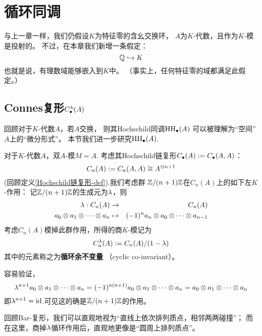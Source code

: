 \chapter{循环同调}

与上一章一样，我们仍假设$K$为特征零的含幺交换环，
$A$为$K$-代数，且作为$K$-模是投射的。
不过，在本章我们新增一条假定：
$$\mathbb{Q}\hookrightarrow K$$
也就是说，有理数域能够嵌入到$K$中。
（事实上，任何特征零的域都满足此假定。）

\section{Connes复形$C^{\lambda}_{\bullet}(A)$}

回顾对于$K$-代数$A$，若$A$交换，
则其Hochschild同调$\operatorname{HH}_{\bullet}(A)$
可以被理解为“空间”$A$上的“微分形式”。
本节我们进一步研究$\operatorname{HH}_{\bullet}(A)$.

\begin{notation}
对于$K$-代数$A$，双$A$-模$M=A$.
考虑其Hochschild链复形$C_{\bullet}(A):=C_{\bullet}(A,A)$：
$$C_n(A):=C_n(A,A)\cong A^{\otimes n+1}$$
(回顾定义\ref{Hochschild链复形-def}).我们考虑群
$\mathbb{Z}/(n+1)\mathbb{Z}$在$C_n(A)$上的如下左$K$-作用：
记$\mathbb{Z}/(n+1)\mathbb{Z}$的生成元为$\lambda$，则
\begin{eqnarray*}
\lambda:C_n(A)&\to&C_n(A)\\
a_0\otimes a_1\otimes\cdots\otimes a_n
&\mapsto&
(-1)^na_n\otimes a_0\otimes\cdots\otimes a_{n-1}
\end{eqnarray*}
考虑$C_n(A)$模掉此群作用，所得的商$K$-模记为
$$C^{\lambda}_n(A):=C_n(A)/(1-\lambda)$$
其中的元素称之为\textbf{循环余不变量}
（cyclic co-invariant）。
\end{notation}


容易验证，
$$\lambda^{n+1}a_0\otimes a_1\otimes\cdots\otimes a_n=
(-1)^{n(n+1)}a_0\otimes a_1\otimes\cdots\otimes a_n
=a_0\otimes a_1\otimes\cdots\otimes a_n$$
即$\lambda^{n+1}=\operatorname{id}$.可见这的确是$\mathbb{Z}/(n+1)\mathbb{Z}$的作用。

回顾Bar-复形，我们可以直观地视为“直线上依次排列质点，相邻两两碰撞”；
而在这里，商掉$\lambda$循环作用后，直观地更像是“圆周上排列质点”。


